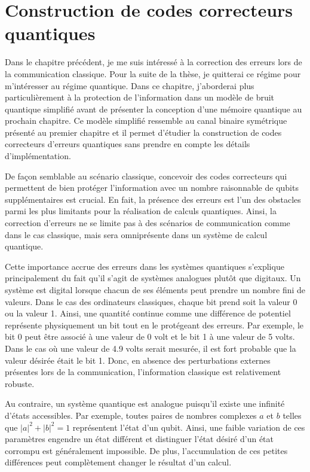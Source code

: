 \begin{comment}
\end{comment}

\chapter{Construction de codes correcteurs quantiques}
\label{chap:construction_codes}

Dans le chapitre précédent, 
je me suis intéressé à la correction des erreurs lors de la communication classique.
Pour la suite de la thèse,
je quitterai ce régime pour m'intéresser au régime quantique.
Dans ce chapitre, 
j'aborderai plus particulièrement à la protection de l'information 
dans un modèle de bruit quantique simplifié avant de présenter la conception d'une mémoire 
quantique au prochain chapitre.
Ce modèle simplifié ressemble au canal binaire symétrique présenté au premier chapitre
et il permet d'étudier la construction de codes correcteurs d'erreurs quantiques sans prendre en compte les détails d'implémentation.

De façon semblable au scénario classique,
concevoir des codes correcteurs qui permettent de bien protéger l'information avec un nombre raisonnable de qubits supplémentaires est crucial.
En fait,
la présence des erreurs est l'un des obstacles parmi les plus
limitants pour la réalisation de calculs quantiques.
Ainsi, 
la correction d'erreurs ne se limite pas à des scénarios de communication 
comme dans le cas classique,
mais sera omniprésente dans un système de calcul quantique.

Cette importance accrue des erreurs dans les systèmes quantiques s'explique
principalement du fait qu'il s'agit de systèmes analogues plutôt que digitaux.
Un système est digital lorsque chacun de ses éléments peut prendre un nombre fini
de valeurs. 
Dans le cas des ordinateurs classiques,
chaque bit prend soit la valeur 0 ou la valeur 1.
Ainsi,
une quantité continue comme une différence de potentiel représente physiquement un bit tout en le protégeant des erreurs.
Par exemple,
le bit 0 peut être associé à une valeur de 0 volt et le bit 1 à une valeur de 5 volts.
Dans le cas où une valeur de 4.9 volts serait mesurée, il est fort probable que 
la valeur désirée était le bit 1.
Donc, en absence des perturbations externes présentes lors de la communication,
l'information classique est relativement robuste.

Au contraire, un système quantique est analogue puisqu'il existe une infinité d'états accessibles.
Par exemple, toutes paires de nombres complexes $a$ et $b$ telles que $|a|^2 + |b|^2 = 1$
représentent l'état d'un qubit.
Ainsi, 
une faible variation de ces paramètres engendre un état différent
et distinguer l'état désiré d'un état corrompu est généralement impossible.
De plus, l'accumulation de ces petites différences peut complètement
changer le résultat d'un calcul.

